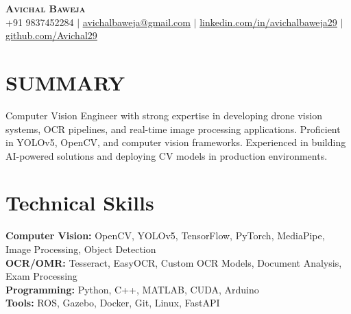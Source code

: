 \documentclass[letterpaper,10pt]{article}
\begin{document}
\begin{center}
    \textbf{\Huge \scshape Avichal Baweja} \\ \vspace{1pt}
    \small +91 9837452284 $|$ \href{mailto:avichalbaweja@gmail.com}{\underline{avichalbaweja@gmail.com}} $|$
    \href{https://www.linkedin.com/in/avichalbaweja29/}{\underline{linkedin.com/in/avichalbaweja29}} $|$
    \href{https://github.com/avichal29}{\underline{github.com/Avichal29}}
\end{center}

\section{SUMMARY}
Computer Vision Engineer with strong expertise in developing drone vision systems, OCR pipelines, and real-time image processing applications. Proficient in YOLOv5, OpenCV, and computer vision frameworks. Experienced in building AI-powered solutions and deploying CV models in production environments.

\section{Technical Skills}
\begin{itemize}[leftmargin=0.2in, label={}]
    \small{\item{
    \textbf{Computer Vision:} OpenCV, YOLOv5, TensorFlow, PyTorch, MediaPipe, Image Processing, Object Detection \\
    \textbf{OCR/OMR:} Tesseract, EasyOCR, Custom OCR Models, Document Analysis, Exam Processing \\
    \textbf{Programming:} Python, C++, MATLAB, CUDA, Arduino \\
    \textbf{Tools:} ROS, Gazebo, Docker, Git, Linux, FastAPI \\
    }}
\end{itemize}
\end{document}
